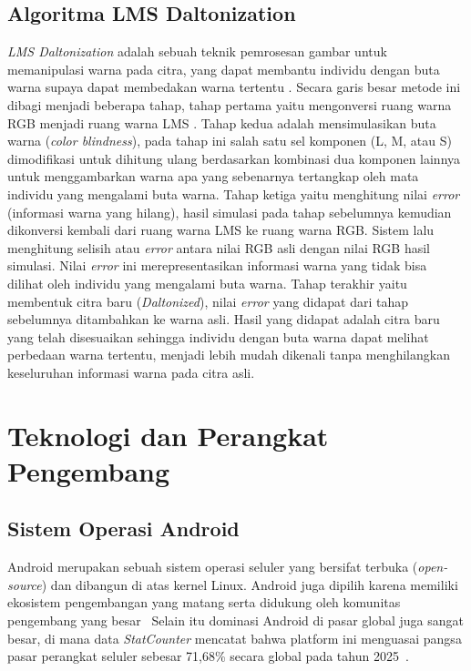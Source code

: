 \subsection{Algoritma LMS Daltonization}
\textit{LMS Daltonization} adalah sebuah teknik pemrosesan gambar untuk memanipulasi warna pada citra, yang dapat membantu individu dengan buta warna supaya dapat membedakan warna tertentu \parencite{muhammad2020analysis}.
Secara garis besar metode ini dibagi menjadi beberapa tahap, tahap pertama yaitu mengonversi ruang warna RGB menjadi ruang warna LMS \parencite{Elrefaei2018, covisance}.
Tahap kedua adalah mensimulasikan buta warna (\textit{color blindness}), pada tahap ini salah satu sel komponen (L, M, atau S) dimodifikasi untuk dihitung ulang berdasarkan kombinasi dua komponen lainnya untuk menggambarkan warna apa yang sebenarnya tertangkap oleh mata individu yang mengalami buta warna.
Tahap ketiga yaitu menghitung nilai \textit{error} (informasi warna yang hilang), hasil simulasi pada tahap sebelumnya kemudian dikonversi kembali dari ruang warna LMS ke ruang warna RGB.
Sistem lalu menghitung selisih atau \textit{error} antara nilai RGB asli dengan nilai RGB hasil simulasi.
Nilai \textit{error} ini merepresentasikan informasi warna yang tidak bisa dilihat oleh individu yang mengalami buta warna.
Tahap terakhir yaitu membentuk citra baru (\textit{Daltonized}), nilai \textit{error} yang didapat dari tahap sebelumnya ditambahkan ke warna asli.
Hasil yang didapat adalah citra baru yang telah disesuaikan sehingga individu dengan buta warna dapat melihat perbedaan warna tertentu, menjadi lebih mudah dikenali tanpa menghilangkan keseluruhan informasi warna pada citra asli.

\section{Teknologi dan Perangkat Pengembang}

\subsection{Sistem Operasi Android}
Android merupakan sebuah sistem operasi seluler yang bersifat terbuka (\textit{open-source}) dan dibangun di atas kernel Linux.
Android juga dipilih karena memiliki ekosistem pengembangan yang matang serta didukung oleh komunitas pengembang yang besar~\parencite{techrepublic2023android,stackoverflow2025survey}
Selain itu dominasi Android di pasar global juga sangat besar, di mana data \textit{StatCounter} mencatat bahwa platform ini menguasai pangsa pasar perangkat seluler sebesar 71,68\% secara global pada tahun 2025~\parencite{statcounter2025mobile}.


